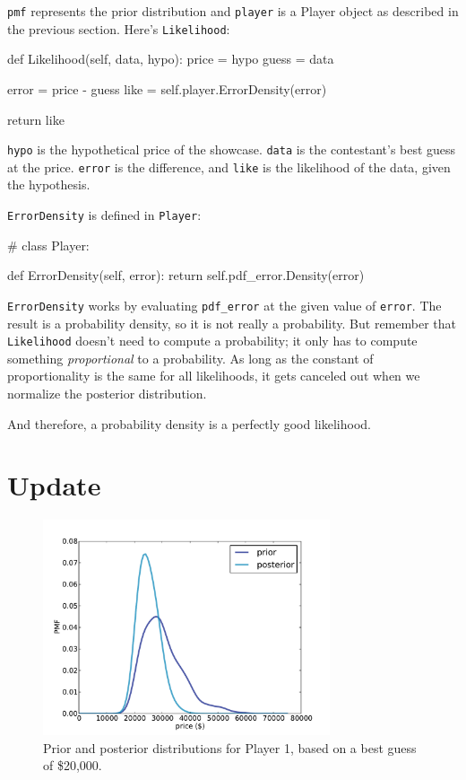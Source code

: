 \documentclass[12pt]{book}
\theoremstyle{exercise}
\begin{document}
{\tt pmf} represents the prior distribution and
{\tt player} is a Player object as described in the previous
section.  Here's {\tt Likelihood}:

\begin{code}
    def Likelihood(self, data, hypo):
        price = hypo
        guess = data

        error = price - guess
        like = self.player.ErrorDensity(error)

        return like
\end{code}

{\tt hypo} is the hypothetical price of the showcase.  {\tt data}
is the contestant's best guess at the price.  {\tt error} is
the difference, and {\tt like} is the likelihood of the data,
given the hypothesis.

{\tt ErrorDensity} is defined in {\tt Player}:

\begin{code}
# class Player:

    def ErrorDensity(self, error):
        return self.pdf_error.Density(error)
\end{code}

{\tt ErrorDensity} works by evaluating \verb"pdf_error" at
the given value of {\tt error}.
The result is a probability density, so it is not really a probability.
But remember that {\tt Likelihood} doesn't
need to compute a probability; it only has to compute something {\em
  proportional} to a probability.  As long as the constant of
proportionality is the same for all likelihoods, it gets canceled out
when we normalize the posterior distribution.

And therefore, a probability density is a perfectly good likelihood.


\section{Update}

\begin{figure}
\centerline{\includegraphics[height=2.5in]{figs/price3.pdf}}
\caption{Prior and posterior distributions for Player 1, based on
  a best guess of \$20,000.}
\label{fig.price3}
\end{figure}
\end{document}
